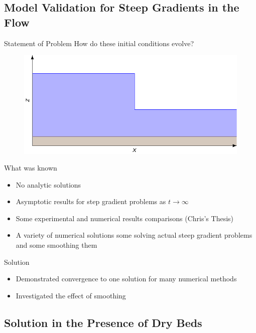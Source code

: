 \documentclass[pdf]{beamer}
\begin{document}
\subsection{ Model Validation for Steep Gradients in the Flow}
\begin{frame}{Statement of Problem}
	How do these initial conditions evolve?
	\begin{figure}
		\includegraphics[width=\textwidth]{./Pics/SteepGradients/Wavetank.pdf}
	\end{figure}
\end{frame}	

\begin{frame}{What was known}
	\begin{itemize}
		\item No analytic solutions
		\item Asymptotic results for step gradient problems as $t \rightarrow \infty$
		\item Some experimental and numerical results comparisons (Chris's Thesis)
		\item A variety of numerical solutions some solving actual steep gradient problems and some  smoothing them
	\end{itemize}
\end{frame}

\begin{frame}{Solution}
	\begin{itemize}
		\item Demonstrated convergence to one solution for many numerical methods
		\item Investigated the effect of smoothing

	\end{itemize}
\end{frame}


\subsection{Solution in the Presence of Dry Beds}
\begin{frame}
\end{frame}
\end{document}
